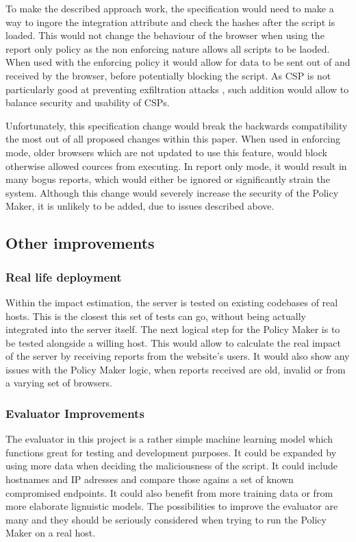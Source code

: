 To make the described approach work, the specification would need to make a way to ingore the integration attribute and check the hashes after the script is loaded.
This would not change the behaviour of the browser when using the report only policy as the non enforcing nature allows all scripts to be laoded.
When used with the enforcing policy it would allow for data to be sent out of and received by the browser, before potentially blocking the script.
As CSP is not particularly good at preventing exfiltration attacks \cite{CSPexfil}, such addition would allow to balance security and usability of CSPs.

Unfortunately, this specification change would break the backwards compatibility the most out of all proposed changes within this paper.
When used in enforcing mode, older browsers which are not updated to use this feature, would block otherwise allowed cources from executing.
In report only mode, it would result in many bogus reports, which would either be ignored or significantly strain the system.
Although this change would severely increase the security of the Policy Maker, it is unlikely to be added, due to issues described above.

\subsection{Other improvements}

\subsubsection{Real life deployment}

Within the impact estimation, the server is tested on existing codebases of real hosts.
This is the closest this set of tests can go, without being actually integrated into the server itself.
The next logical step for the Policy Maker is to be tested alongside a willing host.
This would allow to calculate the real impact of the server by receiving reports from the website's users.
It would also show any issues with the Policy Maker logic, when reports received are old, invalid or from a varying set of browsers.

\subsubsection{Evaluator Improvements}

The evaluator in this project is a rather simple machine learning model which functions great for testing and development purposes.
It could be expanded by using more data when deciding the maliciousness of the script.
It could include hostnames and IP adresses and compare those agains a set of known compromised endpoints.
It could also benefit from more training data or from more elaborate lignuistic models.
The possibilities to improve the evaluator are many and they should be seriously considered when trying to run the Policy Maker on a real host.

